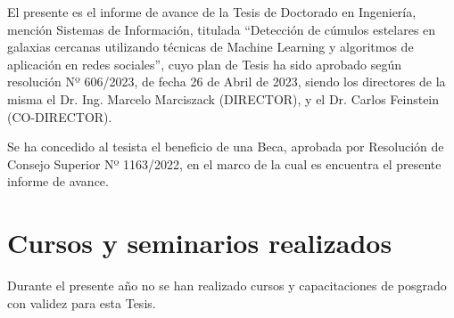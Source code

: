 \documentclass[
	11pt,oneside,a4paper,
	fleqn,
	article
]{memoir}
\begin{document}


\newpage

El presente es el informe de avance de la Tesis de Doctorado en Ingeniería, mención Sistemas de Información, titulada ``Detección de cúmulos estelares en galaxias cercanas utilizando técnicas de Machine Learning y algoritmos de aplicación en redes sociales'', cuyo plan de Tesis ha sido aprobado según resolución Nº 606/2023, de fecha 26 de Abril de 2023, siendo los directores de la misma el Dr. Ing. Marcelo Marciszack (DIRECTOR), y el Dr. Carlos Feinstein (CO-DIRECTOR).

\ifdefined\beca
Se ha concedido al tesista el beneficio de una Beca, aprobada por Resolución de Consejo Superior Nº 1163/2022, en el marco de la cual es encuentra el presente informe de avance.
\fi

\tableofcontents

\section {Cursos y seminarios realizados}

Durante el presente año no se han realizado cursos y capacitaciones de posgrado con validez para esta Tesis.



\end{document}
